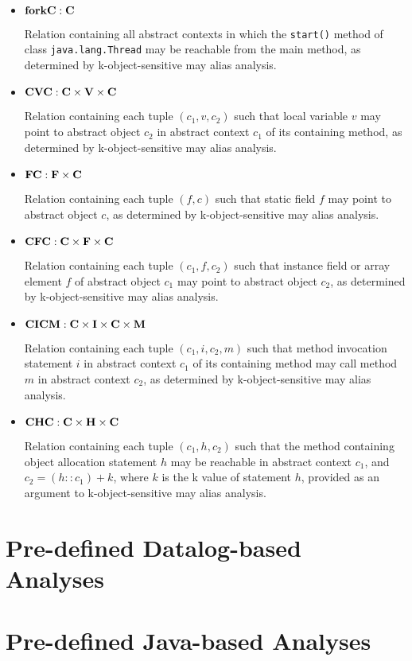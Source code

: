 \documentclass{article}
\providecommand\Mdom{{\bf M}}
\providecommand\Idom{{\bf I}}
\providecommand\Vdom{{\bf V}}
\providecommand\Hdom{{\bf H}}
\providecommand\Fdom{{\bf F}}
\providecommand\Cdom{{\bf C}}
\providecommand\forkC{{\bf forkC}}
\providecommand\CVC{{\bf CVC}}
\providecommand\FC{{\bf FC}}
\providecommand\CFC{{\bf CFC}}
\providecommand\CICM{{\bf CICM}}
\providecommand\CHC{{\bf CHC}}
\begin{document}
\begin{itemize}
\item
$\forkC : \Cdom$

Relation containing all abstract contexts in which the
{\tt start()} method of class {\tt java.lang.Thread} may
be reachable from the main method, as determined by
k-object-sensitive may alias analysis.

\item
$\CVC : \Cdom \times \Vdom \times \Cdom$

Relation containing each tuple $(c_1,v,c_2)$ such that local variable
$v$ may point to abstract object $c_2$ in abstract context $c_1$ of its
containing method, as determined by k-object-sensitive may alias
analysis.

\item
$\FC : \Fdom \times \Cdom$

Relation containing each tuple $(f,c)$ such that static field $f$
may point to abstract object $c$, as determined by k-object-sensitive
may alias analysis.

\item
$\CFC : \Cdom \times \Fdom \times \Cdom$

Relation containing each tuple $(c_1,f,c_2)$ such that instance field
or array element $f$ of abstract object $c_1$ may point to abstract
object $c_2$, as determined by k-object-sensitive may alias analysis.

\item
$\CICM : \Cdom \times \Idom \times \Cdom \times \Mdom$

Relation containing each tuple $(c_1,i,c_2,m)$ such that method
invocation statement $i$ in abstract context $c_1$ of its containing method
may call method $m$ in abstract context $c_2$, as determined by
k-object-sensitive may alias analysis.

\item
$\CHC : \Cdom \times \Hdom \times \Cdom$

Relation containing each tuple $(c_1,h,c_2)$ such that the method
containing object allocation statement $h$ may be reachable in
abstract context $c_1$, and $c_2 = (h::c_1) + k$, where $k$ is the k
value of statement $h$, provided as an argument to k-object-sensitive
may alias analysis.

\end{itemize}

\texonly{\newpage}
\section{Pre-defined Datalog-based Analyses}
\label{sec-predef-datalog-analyses}

\texonly{\newpage}
\section{Pre-defined Java-based Analyses}
\label{sec-predef-java-analyses}

\texonly{\newpage}


\end{document}
